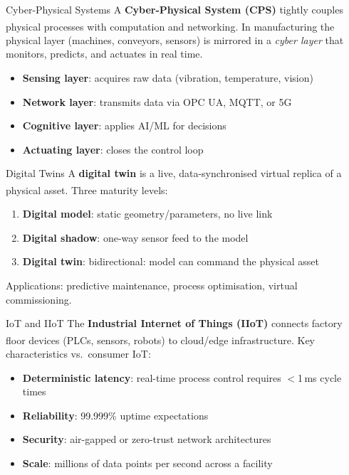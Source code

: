 \begin{v3topic}{Cyber-Physical Systems}
    A \textbf{Cyber-Physical System (CPS)} tightly couples physical processes with computation and networking\textsuperscript{\cite[][pp.~3--8]{singhEmergenceCyberPhysical2021}}.
    In manufacturing the physical layer (machines, conveyors, sensors) is mirrored in a \emph{cyber layer} that monitors, predicts, and actuates in real time.
    \begin{itemize}
        \item \textbf{Sensing layer}: acquires raw data (vibration, temperature, vision)
        \item \textbf{Network layer}: transmits data via OPC UA, MQTT, or 5G
        \item \textbf{Cognitive layer}: applies AI/ML for decisions
        \item \textbf{Actuating layer}: closes the control loop
    \end{itemize}

\end{v3topic}
\begin{v3topic}{Digital Twins}
    A \textbf{digital twin} is a live, data-synchronised virtual replica of a physical asset\textsuperscript{\cite[][pp.~2405--2406]{bocewiczDigitalTwinManufacturing2021}}.
    Three maturity levels:
    \begin{enumerate}
        \item \textbf{Digital model}: static geometry/parameters, no live link
        \item \textbf{Digital shadow}: one-way sensor feed to the model
        \item \textbf{Digital twin}: bidirectional: model can command the physical asset
    \end{enumerate}
    Applications: predictive maintenance, process optimisation, virtual commissioning.

\end{v3topic}
\begin{v3topic}{IoT and IIoT}
    The \textbf{Industrial Internet of Things (IIoT)} connects factory floor devices (PLCs, sensors, robots) to cloud/edge infrastructure\textsuperscript{\cite[][pp.~1--15]{mahmoodInternetThingsIndustrial2019}}.
    Key characteristics vs.\ consumer IoT:
    \begin{itemize}
        \item \textbf{Deterministic latency}: real-time process control requires $<$1\,ms cycle times
        \item \textbf{Reliability}: 99.999\% uptime expectations
        \item \textbf{Security}: air-gapped or zero-trust network architectures
        \item \textbf{Scale}: millions of data points per second across a facility
    \end{itemize}

\end{v3topic}
